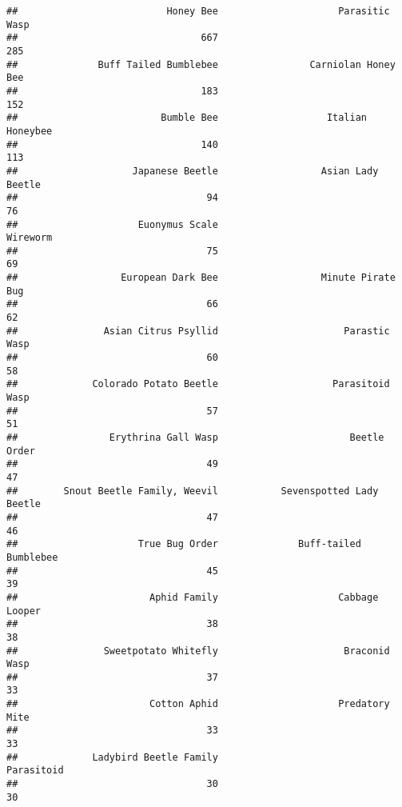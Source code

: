 \documentclass[]{article}
\newenvironment{Shaded}{\begin{snugshade}}{\end{snugshade}}
\newcommand{\KeywordTok}[1]{\textcolor[rgb]{0.13,0.29,0.53}{\textbf{#1}}}
\newcommand{\NormalTok}[1]{#1}
\newcommand{\OperatorTok}[1]{\textcolor[rgb]{0.81,0.36,0.00}{\textbf{#1}}}
\begin{document}
\begin{Shaded}
\end{Shaded}

\begin{verbatim}
##                          Honey Bee                     Parasitic Wasp 
##                                667                                285 
##              Buff Tailed Bumblebee                Carniolan Honey Bee 
##                                183                                152 
##                         Bumble Bee                   Italian Honeybee 
##                                140                                113 
##                    Japanese Beetle                  Asian Lady Beetle 
##                                 94                                 76 
##                     Euonymus Scale                           Wireworm 
##                                 75                                 69 
##                  European Dark Bee                  Minute Pirate Bug 
##                                 66                                 62 
##               Asian Citrus Psyllid                      Parastic Wasp 
##                                 60                                 58 
##             Colorado Potato Beetle                    Parasitoid Wasp 
##                                 57                                 51 
##                Erythrina Gall Wasp                       Beetle Order 
##                                 49                                 47 
##        Snout Beetle Family, Weevil           Sevenspotted Lady Beetle 
##                                 47                                 46 
##                     True Bug Order              Buff-tailed Bumblebee 
##                                 45                                 39 
##                       Aphid Family                     Cabbage Looper 
##                                 38                                 38 
##               Sweetpotato Whitefly                      Braconid Wasp 
##                                 37                                 33 
##                       Cotton Aphid                     Predatory Mite 
##                                 33                                 33 
##             Ladybird Beetle Family                         Parasitoid 
##                                 30                                 30 

\end{verbatim}
\end{document}
